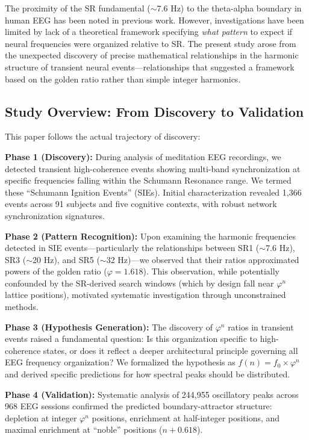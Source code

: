 \documentclass[11pt,a4paper]{article}
\newcommand{\phisym}{\varphi}
\begin{document}
The proximity of the SR fundamental ($\sim$7.6 Hz) to the theta-alpha boundary in human EEG has been noted in previous work. However, investigations have been limited by lack of a theoretical framework specifying \textit{what pattern} to expect if neural frequencies were organized relative to SR. The present study arose from the unexpected discovery of precise mathematical relationships in the harmonic structure of transient neural events---relationships that suggested a framework based on the golden ratio rather than simple integer harmonics.

\subsection{Study Overview: From Discovery to Validation}

This paper follows the actual trajectory of discovery:

\textbf{Phase 1 (Discovery):} During analysis of meditation EEG recordings, we detected transient high-coherence events showing multi-band synchronization at specific frequencies falling within the Schumann Resonance range. We termed these ``Schumann Ignition Events'' (SIEs). Initial characterization revealed 1,366 events across 91 subjects and five cognitive contexts, with robust network synchronization signatures.

\textbf{Phase 2 (Pattern Recognition):} Upon examining the harmonic frequencies detected in SIE events---particularly the relationships between SR1 ($\sim$7.6 Hz), SR3 ($\sim$20 Hz), and SR5 ($\sim$32 Hz)---we observed that their ratios approximated powers of the golden ratio ($\phisym = 1.618$). This observation, while potentially confounded by the SR-derived search windows (which by design fall near $\phisym^n$ lattice positions), motivated systematic investigation through unconstrained methods.

\textbf{Phase 3 (Hypothesis Generation):} The discovery of $\phisym^n$ ratios in transient events raised a fundamental question: Is this organization specific to high-coherence states, or does it reflect a deeper architectural principle governing all EEG frequency organization? We formalized the hypothesis as $f(n) = f_0 \times \phisym^n$ and derived specific predictions for how spectral peaks should be distributed.

\textbf{Phase 4 (Validation):} Systematic analysis of 244,955 oscillatory peaks across 968 EEG sessions confirmed the predicted boundary-attractor structure: depletion at integer $\phisym^n$ positions, enrichment at half-integer positions, and maximal enrichment at ``noble'' positions ($n + 0.618$).
\end{document}
